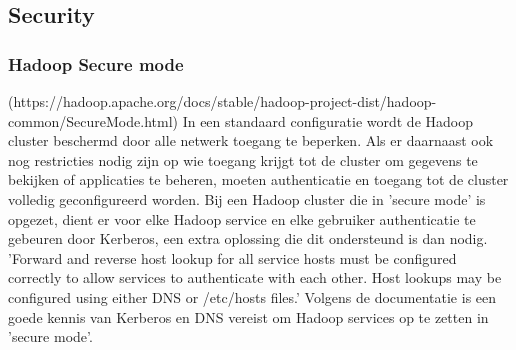 \subsection{Security}

\subsubsection{Hadoop Secure mode} (https://hadoop.apache.org/docs/stable/hadoop-project-dist/hadoop-common/SecureMode.html)
In een standaard configuratie wordt de Hadoop cluster beschermd door alle netwerk toegang te beperken. Als er daarnaast ook nog restricties nodig zijn op wie toegang krijgt tot de cluster om gegevens te bekijken of applicaties te beheren, moeten authenticatie en toegang tot de cluster volledig geconfigureerd worden. Bij een Hadoop cluster die in 'secure mode' is opgezet, dient er voor elke Hadoop service en elke gebruiker authenticatie te gebeuren door Kerberos, een extra oplossing die dit ondersteund is dan nodig.
\newline
\newline
'Forward and reverse host lookup for all service hosts must be configured correctly to allow services to authenticate with each other. Host lookups may be configured using either DNS or /etc/hosts files.'
\newline
\newline
Volgens de documentatie is een goede kennis van Kerberos en DNS vereist om Hadoop services op te zetten in 'secure mode'.
\newline
\newline
